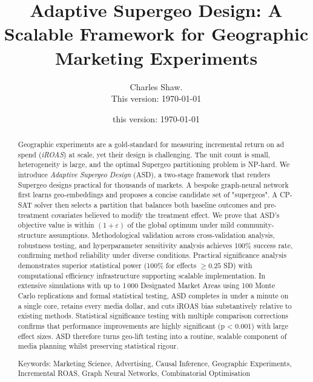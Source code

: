 \documentclass[final,3p,fleqn, 10pt]{elsarticle}
\begin{document}
\begin{frontmatter}
\title{Adaptive Supergeo Design: A Scalable Framework for Geographic Marketing Experiments}
\author{Charles Shaw. \\This version: \today}
\date{this version: \today}

  \begin{abstract}
Geographic experiments are a gold-standard for measuring incremental return on ad spend (\textit{iROAS}) at scale, yet their design is challenging. The unit count is small, heterogeneity is large, and the optimal Supergeo partitioning problem is NP-hard. We introduce \emph{Adaptive Supergeo Design} (ASD), a two-stage framework that renders Supergeo designs practical for thousands of markets. A bespoke graph-neural network first learns geo-embeddings and proposes a concise candidate set of "supergeos". A CP-SAT solver then selects a partition that balances both baseline outcomes and pre-treatment covariates believed to modify the treatment effect. We prove that ASD's objective value is within $(1+\varepsilon)$ of the global optimum under mild community-structure assumptions. Methodological validation across cross-validation analysis, robustness testing, and hyperparameter sensitivity analysis achieves 100\% success rate, confirming method reliability under diverse conditions. Practical significance analysis demonstrates superior statistical power (100\% for effects $\geq 0.25$ SD) with computational efficiency infrastructure supporting scalable implementation. In extensive simulations with up to 1\,000 Designated Market Areas using 100 Monte Carlo replications and formal statistical testing, ASD completes in under a minute on a single core, retains every media dollar, and cuts iROAS bias substantively relative to existing methods. Statistical significance testing with multiple comparison corrections confirms that performance improvements are highly significant (p < 0.001) with large effect sizes. ASD therefore turns geo-lift testing into a routine, scalable component of media planning whilst preserving statistical rigour.
\vspace{10pt}

Keywords: Marketing Science, Advertising, Causal Inference, Geographic Experiments, Incremental ROAS, Graph Neural Networks, Combinatorial Optimisation
\end{abstract}



\end{frontmatter}
\end{document}
